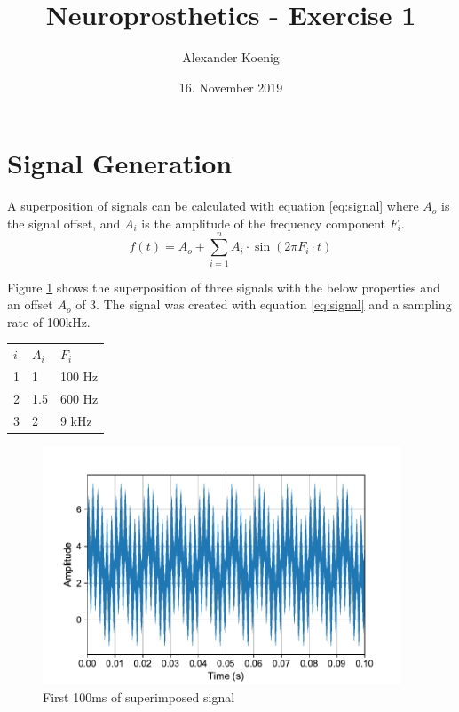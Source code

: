 \documentclass{scrartcl}
\title{Neuroprosthetics - Exercise 1}
\author{Alexander Koenig}
\date{16. November 2019}
\begin{document}
\maketitle

\section{Signal Generation}

A superposition of signals can be calculated with equation \ref{eq:signal} where $A_{o}$ is the signal offset, and $A_{i}$ is the amplitude of the frequency component $F_{i}$. 
\begin{equation}
	\label{eq:signal}
	f(t) = A_{o} + \sum_{i=1}^{n}A_{i} \cdot\sin (2\pi F_{i} \cdot t)
\end{equation}

Figure \ref{fig:signal} shows the superposition of three signals with the below properties and an offset $A_{o}$ of 3. The signal was created with equation \ref{eq:signal} and a sampling rate of 100kHz. 

\begin{table}[h]
\centering
\begin{tabular}{|l|l|l|}
\hline
$i$ & $A_{i}$ & $F_{i}$ \\ \hhline{|=|=|=|}
1   & 1       & 100 Hz  \\ \hline
2   & 1.5     & 600 Hz  \\ \hline
3   & 2       & 9 kHz   \\ \hline
\end{tabular}

\label{tab:values}
\end{table}
\begin{figure}[h]
	\centering
	\includegraphics[width=0.95\textwidth]{figures/signal.pdf}
	\caption{First 100ms of superimposed signal}
	\label{fig:signal}
\end{figure}
\end{document}
